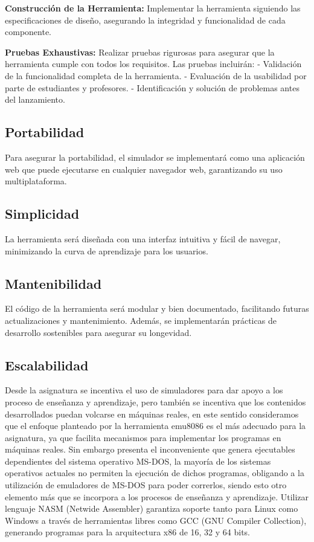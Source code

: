 \documentclass[12pt,twoside]{templates/unerthesis}
\begin{document}
\textbf{Construcción de la Herramienta:} Implementar la herramienta siguiendo las especificaciones de diseño, asegurando la integridad y funcionalidad de cada componente.

\textbf{Pruebas Exhaustivas:} Realizar pruebas rigurosas para asegurar que la herramienta cumple con todos los requisitos. Las pruebas incluirán:
- Validación de la funcionalidad completa de la herramienta.
- Evaluación de la usabilidad por parte de estudiantes y profesores.
- Identificación y solución de problemas antes del lanzamiento.

\hypertarget{portabilidad}{%
\subsection{Portabilidad}\label{portabilidad}}

Para asegurar la portabilidad, el simulador se implementará como una aplicación web que puede ejecutarse en cualquier navegador web, garantizando su uso multiplataforma.

\hypertarget{simplicidad}{%
\subsection{Simplicidad}\label{simplicidad}}

La herramienta será diseñada con una interfaz intuitiva y fácil de navegar, minimizando la curva de aprendizaje para los usuarios.

\hypertarget{mantenibilidad}{%
\subsection{Mantenibilidad}\label{mantenibilidad}}

El código de la herramienta será modular y bien documentado, facilitando futuras actualizaciones y mantenimiento. Además, se implementarán prácticas de desarrollo sostenibles para asegurar su longevidad.

\hypertarget{escalabilidad}{%
\subsection{Escalabilidad}\label{escalabilidad}}

Desde la asignatura se incentiva el uso de simuladores para dar apoyo a los proceso de enseñanza y aprendizaje, pero también se incentiva que los contenidos desarrollados puedan volcarse en máquinas reales, en este sentido consideramos que el enfoque planteado por la herramienta emu8086 es el más adecuado para la asignatura, ya que facilita mecanismos para implementar los programas en máquinas reales. Sin embargo presenta el inconveniente que genera ejecutables dependientes del sistema operativo MS-DOS, la mayoría de los sistemas operativos actuales no permiten la ejecución de dichos programas, obligando a la utilización de emuladores de MS-DOS para poder correrlos, siendo esto otro elemento más que se incorpora a los procesos de enseñanza y aprendizaje.
Utilizar lenguaje NASM (Netwide Assembler) garantiza soporte tanto para Linux como Windows a través de herramientas libres como GCC (GNU Compiler Collection), generando programas para la arquitectura x86 de 16, 32 y 64 bits.
\end{document}
